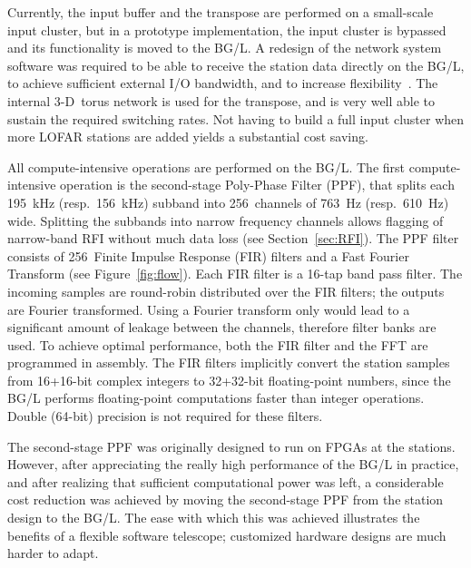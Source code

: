 \documentclass[journal]{IEEEtran}
\begin{document}
Currently, the input buffer and the transpose are performed on a small-scale
input cluster, but in a prototype implementation, the input cluster is
bypassed and its functionality is moved to the BG/L.
A redesign of the network system software was required to be able to
receive the station data directly on the BG/L, to achieve sufficient
external I/O bandwidth, and to increase flexibility~\cite{Iskra:08}.
The internal 3-D~torus network is used for the transpose, and is very well able
to sustain the required switching rates.
Not having to build a full input cluster when more LOFAR stations are added
yields a substantial cost saving.

All compute-intensive operations are performed on the BG/L.
The first compute-intensive operation is the second-stage Poly-Phase Filter
(PPF), that splits each 195~kHz (resp.\ 156~kHz) subband into 256~channels of
763~Hz (resp.\ 610~Hz) wide.
Splitting the subbands into narrow frequency channels allows flagging
of narrow-band RFI without much data loss (see Section~\ref{sec:RFI}).
The PPF filter consists of 256~Finite Impulse Response (FIR) filters and a
Fast Fourier Transform (see Figure~\ref{fig:flow}).
Each FIR filter is a 16-tap band pass filter.
The incoming samples are round-robin distributed over the FIR filters;
the outputs are Fourier transformed.
Using a Fourier transform only would lead to a significant amount of leakage
between the channels, therefore filter banks are used.
To achieve optimal performance, both the FIR filter and the FFT are programmed
in assembly.
The FIR filters implicitly convert the station samples from 16+16-bit complex
integers to 32+32-bit floating-point numbers, since the BG/L performs
floating-point computations faster than integer operations.
Double (64-bit) precision is not required for these filters.

The second-stage PPF was originally designed to run on FPGAs at the stations.
However, after appreciating the really high performance of the BG/L in
practice, and after realizing that sufficient computational power was left, a
considerable cost reduction was achieved by moving the second-stage PPF from
the station design to the BG/L.
The ease with which this was achieved illustrates the benefits of a flexible
software telescope; customized hardware designs are much harder to adapt.
\end{document}
